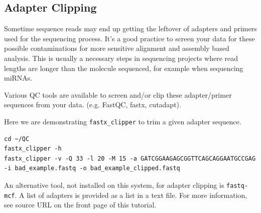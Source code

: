 \begin{advanced}
\subsection{Adapter Clipping}
Sometime sequence reads may end up getting the leftover of adapters and primers
used for the sequencing process. It's a good practice to screen your data for
these possible contaminations for more sensitive alignment and assembly based
analysis. This is usually a necessary steps in sequencing projects where read
lengths are longer than the molecule sequenced, for example when sequencing
miRNAs.

Various QC tools are available to screen and/or clip these adapter/primer
sequences from your data. (e.g. FastQC, fastx, cutadapt).

\begin{steps}
Here we are demonstrating \texttt{fastx\_clipper} to trim a given adapter
sequence.

\begin{lstlisting}
cd ~/QC
fastx_clipper -h
fastx_clipper -v -Q 33 -l 20 -M 15 -a GATCGGAAGAGCGGTTCAGCAGGAATGCCGAG -i bad_example.fastq -o bad_example_clipped.fastq
\end{lstlisting}
\end{steps}

\begin{note}
An alternative tool, not installed on this system, for adapter clipping is
\texttt{fastq-mcf}. A list of adapters is provided as a list in a text file. For more
information, see source URL on the front page of this tutorial.
\end{note}
\end{advanced}

